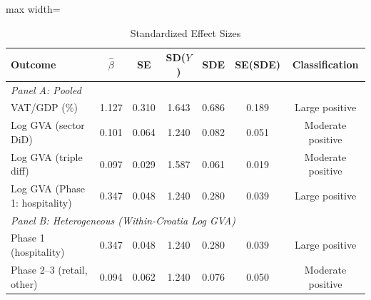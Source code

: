 \begin{table}[htbp]
\centering
\caption{Standardized Effect Sizes}
\label{tab:sde}
\begin{adjustbox}{max width=\textwidth}
\begin{tabular}{lcccccc}
\hline\hline
Outcome & $\hat{\beta}$ & SE & SD($Y$) & SDE & SE(SDE) & Classification \\
\hline
\multicolumn{7}{l}{\textit{Panel A: Pooled}} \\
VAT/GDP (\%) & 1.127 & 0.310 & 1.643 & 0.686 & 0.189 & Large positive \\
Log GVA (sector DiD) & 0.101 & 0.064 & 1.240 & 0.082 & 0.051 & Moderate positive \\
Log GVA (triple diff) & 0.097 & 0.029 & 1.587 & 0.061 & 0.019 & Moderate positive \\
Log GVA (Phase 1: hospitality) & 0.347 & 0.048 & 1.240 & 0.280 & 0.039 & Large positive \\
\hline
\multicolumn{7}{l}{\textit{Panel B: Heterogeneous (Within-Croatia Log GVA)}} \\
Phase 1 (hospitality) & 0.347 & 0.048 & 1.240 & 0.280 & 0.039 & Large positive \\
Phase 2--3 (retail, other) & 0.094 & 0.062 & 1.240 & 0.076 & 0.050 & Moderate positive \\
\hline\hline
\end{tabular}
\end{adjustbox}
\begin{tablenotes}[flushleft]
\footnotesize

\end{tablenotes}
\end{table}
